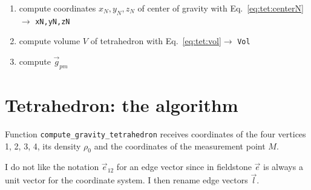 \begin{enumerate}
\item compute coordinates $x_N,y_N,z_N$ of center of gravity with Eq.~\eqref{eq:tet:centerN}
$\rightarrow$ \verb|xN,yN,zN|

\item compute volume $V$ of tetrahedron with Eq.~\eqref{eq:tet:vol}$ \rightarrow$ \verb|Vol| 
\item compute $\vec{g}_{pm}$
\end{enumerate}

\section*{Tetrahedron: the algorithm}

Function \verb|compute_gravity_tetrahedron| receives coordinates of the four vertices {\color{teal}1}, 
{\color{teal}2}, {\color{teal}3}, {\color{teal}4}, its density $\rho_0$ and the coordinates of the 
measurement point $M$.

I do not like the notation $\vec{e}_{12}$ for an edge vector since in fieldstone $\vec{e}$ is always 
a unit vector for the coordinate system. I then rename edge vectors $\vec{l}$.

